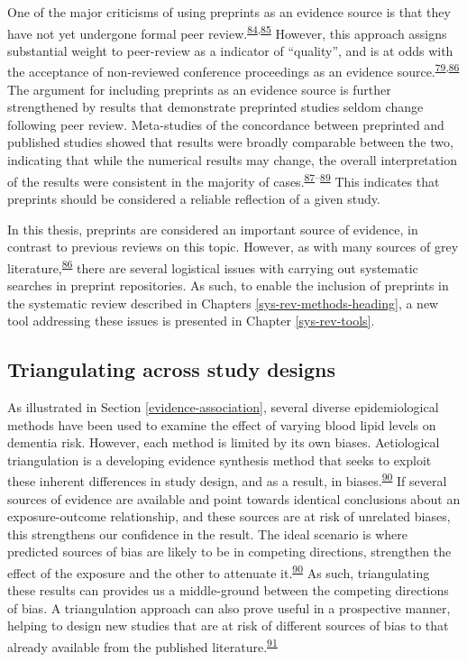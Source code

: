 \documentclass[a4paper, twoside]{templates/ociamthesis}
\begin{document}
One of the major criticisms of using preprints as an evidence source is that they have not yet undergone formal peer review.\textsuperscript{\protect\hyperlink{ref-maslove2018}{84},\protect\hyperlink{ref-schalkwyk2020}{85}} However, this approach assigns substantial weight to peer-review as a indicator of ``quality'', and is at odds with the acceptance of non-reviewed conference proceedings as an evidence source.\textsuperscript{\protect\hyperlink{ref-lefebvre2019searching}{79},\protect\hyperlink{ref-mahood2014}{86}} The argument for including preprints as an evidence source is further strengthened by results that demonstrate preprinted studies seldom change following peer review. Meta-studies of the concordance between preprinted and published studies showed that results were broadly comparable between the two, indicating that while the numerical results may change, the overall interpretation of the results were consistent in the majority of cases.\textsuperscript{\protect\hyperlink{ref-shi2021}{87}--\protect\hyperlink{ref-nicholson2021}{89}} This indicates that preprints should be considered a reliable reflection of a given study.

In this thesis, preprints are considered an important source of evidence, in contrast to previous reviews on this topic. However, as with many sources of grey literature,\textsuperscript{\protect\hyperlink{ref-mahood2014}{86}} there are several logistical issues with carrying out systematic searches in preprint repositories. As such, to enable the inclusion of preprints in the systematic review described in Chapters \ref{sys-rev-methods-heading}, a new tool addressing these issues is presented in Chapter \ref{sys-rev-tools}.

\hypertarget{intro-triangulation}{%
\subsection{Triangulating across study designs}\label{intro-triangulation}}

As illustrated in Section \ref{evidence-association}, several diverse epidemiological methods have been used to examine the effect of varying blood lipid levels on dementia risk. However, each method is limited by its own biases. Aetiological triangulation is a developing evidence synthesis method that seeks to exploit these inherent differences in study design, and as a result, in biases.\textsuperscript{\protect\hyperlink{ref-lawlor2016}{90}} If several sources of evidence are available and point towards identical conclusions about an exposure-outcome relationship, and these sources are at risk of unrelated biases, this strengthens our confidence in the result. The ideal scenario is where predicted sources of bias are likely to be in competing directions, strengthen the effect of the exposure and the other to attenuate it.\textsuperscript{\protect\hyperlink{ref-lawlor2016}{90}} As such, triangulating these results can provides us a middle-ground between the competing directions of bias. A triangulation approach can also prove useful in a prospective manner, helping to design new studies that are at risk of different sources of bias to that already available from the published literature.\textsuperscript{\protect\hyperlink{ref-munafo2018}{91}}
\end{document}
